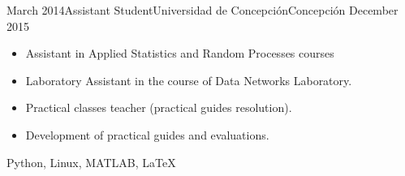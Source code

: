 \begin{experiences}
  \experience
  {March 2014}{Assistant Student}{Universidad de Concepción}{Concepción}
  {December 2015}{
    \begin{itemize}
      \item Assistant in Applied Statistics and Random Processes courses
      \item Laboratory Assistant in the course of Data Networks Laboratory.  
      \item Practical classes teacher (practical guides resolution).
      \item Development of practical guides and evaluations.
    \end{itemize}
  }{Python, Linux, MATLAB, \LaTeX}
\end{experiences}

